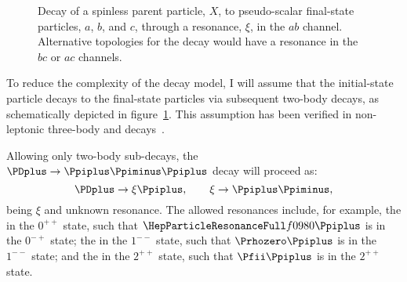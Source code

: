 
    \begin{figure}
        \centering
        
        \caption[Decay of a spinless parent particle to pseudo-scalar final-state particles through a resonance.]%
                {Decay of a spinless parent particle, $X$, to pseudo-scalar final-state particles, $a$, $b$, and $c$, through a resonance, $\xi$, in the $ab$ channel.
        Alternative topologies for the decay would have a resonance in the $bc$ or $ac$ channels.}
        \label{fig:isobar_three_body_decay}
    \end{figure}
    To reduce the complexity of the decay model, I will assume that the initial-state particle decays to the final-state particles via subsequent two-body decays, as schematically depicted in figure~\ref{fig:isobar_three_body_decay}.
    This assumption has been verified in non-leptonic three-body \PD{} and \PB{} decays~\cite[\S~13.2]{Bevan:2014iga}.


    Allowing only two-body sub-decays, the $\PDplus \to \Ppiplus\Ppiminus\Ppiplus$ decay will proceed as:
    \begin{equation}
        \PDplus\to\xi\Ppiplus,\qquad
        \xi\to\Ppiplus\Ppiminus,
    \end{equation}
    being $\xi$ and unknown resonance.
    The allowed resonances include, for example, the \Pfnez{} in the $0^{++}$ state, such that $\Pfnez\Ppiplus$ is in the $0^{-+}$ state;
    the \Prhozero{} in the $1^{--}$ state, such that $\Prhozero\Ppiplus$ is in the $1^{--}$ state;
    and the \Pfii{} in the $2^{++}$ state, such that $\Pfii\Ppiplus$ is in the $2^{++}$ state.


